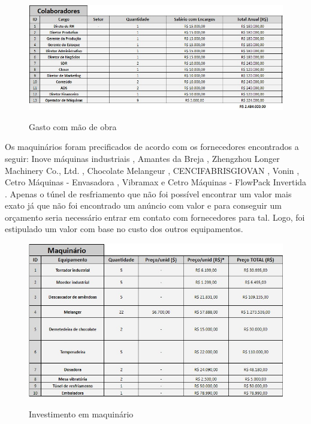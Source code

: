 \documentclass[
	12pt,				%
	openright,			%
	oneside,			%
	a4paper,			%
	english,			%
	french,				%
	spanish,			%
	brazil				%
	]{abntex2}
\begin{document}
\begin{figure}[H]
\begin{center}
\caption{Gasto com mão de obra}
\includegraphics[scale=0.6]{4.jpeg} 
\label{-}
\end{center}
\end{figure}


Os maquinários foram precificados de acordo com os fornecedores encontrados a seguir: Inove máquinas industriais \cite{m1}, Amantes da Breja \cite{m2}, Zhengzhou Longer Machinery Co., Ltd. \cite{m3}, Chocolate Melangeur \cite{m4}, CENCIFABRISGIOVAN \cite{m5}, Vonin \cite{m6}, Cetro Máquinas - Envasadora \cite{m7}, Vibramax \cite{m8} e Cetro Máquinas - FlowPack Invertida \cite{m9}. Apenas o túnel de resfriamento que não foi possível encontrar um valor mais exato já que não foi encontrado um anúncio com valor e para conseguir um orçamento seria necessário entrar em contato com fornecedores para tal. Logo, foi estipulado um valor com base no custo dos outros equipamentos.


\begin{figure}[H]
\begin{center}
\caption{Investimento em maquinário}
\includegraphics[scale=0.6]{5.jpeg} 
\label{-}
\end{center}
\end{figure}
\end{document}
